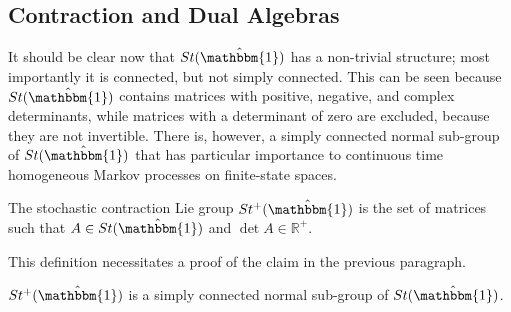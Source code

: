 \subsection{Contraction and Dual Algebras}
It should be clear now that $St(\hat{\mathbbm{1}})$ has a non-trivial structure; most
importantly it is connected, but not simply connected. This can be seen because $St(\hat{\mathbbm{1}})$
contains matrices with positive, negative, and complex determinants, while matrices with a 
determinant of zero are excluded, because they are not invertible. There is, however, a 
simply connected normal sub-group of $St(\hat{\mathbbm{1}})$ that has particular importance 
to continuous time homogeneous Markov processes on finite-state spaces.
\begin{definition}
	The stochastic contraction Lie group $St^{+}(\hat{\mathbbm{1}})$ is the set
	of matrices such that $A \in St(\hat{\mathbbm{1}})$ and $\det A \in \mathbb{R}^{+}$.
\end{definition}
This definition necessitates a proof of the claim in the previous paragraph.
\begin{corollary}
	$St^{+}(\hat{\mathbbm{1}})$ is a simply connected normal sub-group of $St(\hat{\mathbbm{1}})$.
\end{corollary}
